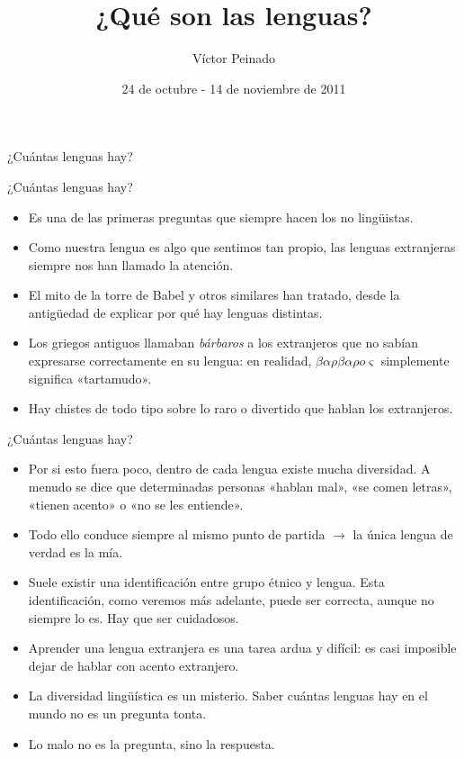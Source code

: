 \documentclass[handout]{beamer}
\title[Comunicación]{¿Qué son las lenguas?}
\author[V. Peinado]{Víctor Peinado}
\institute[UCM]{
  \texttt{v.peinado@filol.ucm.es}\\[1ex]
  
  Grado de Logopedia, Universidad Complutense de Madrid\\[1ex]
}
\date[Noviembre 2010]{24 de octubre - 14 de noviembre de 2011}
\begin{document}
\let\ipa\textipa
\let\it\textit

\begin{frame}[plain]
  \titlepage
\end{frame}


\begin{frame}{}
\begin{center}
\LARGE ¿Cuántas lenguas hay?
\end{center}
\end{frame}


\begin{frame}{¿Cuántas lenguas hay?}

\begin{itemize}
	\item Es una de las primeras preguntas que siempre hacen los no lingüistas.
	\item Como nuestra lengua es algo que sentimos tan propio, las lenguas extranjeras siempre nos han llamado la atención.
	\item El mito de la torre de Babel y otros similares han tratado, desde la antigüedad de explicar por qué hay lenguas distintas.
	\item Los griegos antiguos llamaban \textit{bárbaros} a los extranjeros que no sabían expresarse correctamente en su lengua: en realidad, $\beta\alpha\rho\beta\alpha\rho o\varsigma$ simplemente significa «tartamudo».
	\item Hay chistes de todo tipo sobre lo raro o divertido que hablan los extranjeros.
\end{itemize}

\end{frame}


\begin{frame}{¿Cuántas lenguas hay?}

\begin{itemize}
	\item Por si esto fuera poco, dentro de cada lengua existe mucha diversidad. A menudo se dice que determinadas personas «hablan mal», «se comen letras», «tienen acento» o «no se les entiende».
	\item Todo ello conduce siempre al mismo punto de partida $\rightarrow$ la única lengua de verdad es la mía.
	\item Suele existir una identificación entre grupo étnico y lengua. Esta identificación, como veremos más adelante, puede ser correcta, aunque no siempre lo es. Hay que ser cuidadosos.
	\item Aprender una lengua extranjera es una tarea ardua y difícil: es casi imposible dejar de hablar con acento extranjero.
	\item La diversidad lingüística es un misterio. Saber cuántas lenguas hay en el mundo no es un pregunta tonta.
	\item Lo malo no es la pregunta, sino la respuesta.
\end{itemize}

\end{frame}
\end{document}
